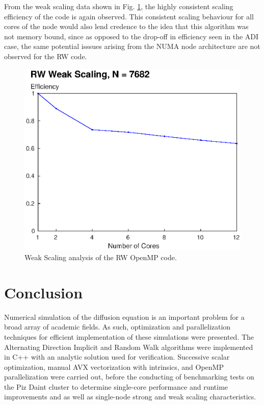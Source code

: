 \documentclass[letterpaper]{article}
\begin{document}
From the weak scaling data shown in Fig. \ref{fig:scaling_weak_RW}, the highly consistent scaling efficiency of the code is again observed. This consistent scaling behaviour for all cores of the node would also lend credence to the idea that this algorithm was not memory bound, since as opposed to the drop-off in efficiency seen in the ADI case, the same potential isssues arising from the NUMA node architecture are not observed for the RW code.

\begin{figure}[!b]\centering
  \includegraphics[width=\linewidth]{./plots/scaling_weak_RW.eps}
  \caption{Weak Scaling analysis of the RW OpenMP code.}
  \label{fig:scaling_weak_RW}
\end{figure}


\section{Conclusion}
Numerical simulation of the diffusion equation is an important problem for a broad array of academic fields. As such, optimization and parallelization techniques for efficient implementation of these simulations were presented. The Alternating Direction Implicit and Random Walk algorithms were implemented in C++ with an analytic solution used for verification. Successive scalar optimization, manual AVX vectorization with intrinsics, and OpenMP parallelization were carried out, before the conducting of benchmarking tests on the Piz Daint cluster to determine single-core performance and runtime improvements and as well as single-node strong and weak scaling characteristics.
\end{document}
